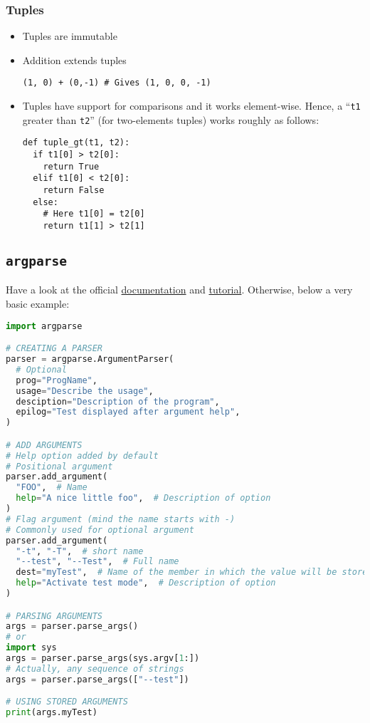 \documentclass[a4paper,12pt,%
              final%
              ]{article}
\begin{document}
\subsubsection{Tuples}%
\begin{itemize}
  \item Tuples are immutable
  \item Addition extends tuples
\begin{verbatim}
(1, 0) + (0,-1) # Gives (1, 0, 0, -1)
\end{verbatim}
  \item Tuples have support for comparisons and it works element-wise. Hence, a ``\texttt{t1} greater than \texttt{t2}'' (for two-elements tuples) works roughly as follows:
\begin{verbatim}
def tuple_gt(t1, t2):
  if t1[0] > t2[0]:
    return True
  elif t1[0] < t2[0]:
    return False
  else:
    # Here t1[0] = t2[0]
    return t1[1] > t2[1]
\end{verbatim}
\end{itemize}

\subsection{\texttt{argparse}}
Have a look at the official \href{https://docs.python.org/3/library/argparse.html}{documentation} and \href{https://docs.python.org/3/howto/argparse.html}{tutorial}. Otherwise, below a very basic example:
\begin{lstlisting}[language=python]
import argparse

# CREATING A PARSER
parser = argparse.ArgumentParser(
  # Optional
  prog="ProgName",
  usage="Describe the usage",
  desciption="Description of the program",
  epilog="Test displayed after argument help",
)

# ADD ARGUMENTS
# Help option added by default
# Positional argument
parser.add_argument(
  "FOO",  # Name
  help="A nice little foo",  # Description of option
)
# Flag argument (mind the name starts with -)
# Commonly used for optional argument
parser.add_argument(
  "-t", "-T",  # short name
  "--test", "--Test",  # Full name
  dest="myTest",  # Name of the member in which the value will be stored
  help="Activate test mode",  # Description of option
)

# PARSING ARGUMENTS
args = parser.parse_args()
# or
import sys
args = parser.parse_args(sys.argv[1:])
# Actually, any sequence of strings
args = parser.parse_args(["--test"])

# USING STORED ARGUMENTS
print(args.myTest)
\end{lstlisting}
\end{document}
